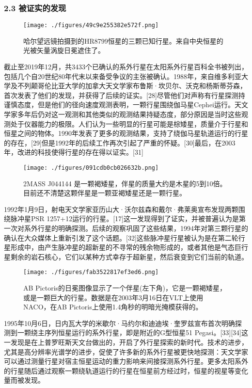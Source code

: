 \subsubsection{2.3 被证实的发现}
\begin{figure}[ht]
\centering
\texttt{[image: ./figures/49c9e255382e572f.png]}
\caption{哈尔望远镜拍摄到的HR8799恒星的三颗已知行星。来自中央恒星的光被矢量涡旋日冕遮住了。} \label{fig_TYXWXX_2}
\end{figure}
截止至2019年12月，共3433个已确认的系外行星在太阳系外行星百科全书被列出，包括几个自20世纪80年代末以来备受争议的主张被确认。1988年，来自维多利亚大学及不列颠哥伦比亚大学的加拿大天文学家布鲁斯·坎贝尔、沃克和杨斯蒂芬森，首次发表了他们的发现，并获得了后续的证实。[28]尽管他们对声称有行星探测持谨慎态度，但是他们的径向速度观测表明，一颗行星围绕伽马星Cephei运行。天文学家多年后仍对这一观测和其他类似的观测结果持疑态度，部分原因是当时这些观测处于仪器能力的极限。人们认为一些明显的行星可能是棕矮星，质量介于行星和恒星之间的物体。1990年发表了更多的观测结果，支持了绕伽马星轨道运行的行星的存在，[29]但是1992年的后续工作再次引起了严重的怀疑。[30]最后，在2003年，改进的科技使得行星的存在得以证实。[31]
\begin{figure}[ht]
\centering
\texttt{[image: ./figures/091cdb0cb026632b.png]}
\caption{2MASS J044144 是一颗褐矮星，伴星的质量大约是木星的5到10倍。目前还不清楚这颗伴星是一颗亚褐矮星还是一颗行星。} \label{fig_TYXWXX_3}
\end{figure}
1992年1月9日，射电天文学家亚历山大·沃尔兹森和戴尔·弗莱奥宣布发现两颗围绕脉冲星PSR 1257+12运行的行星。[17]这一发现得到了证实，并被普遍认为是第一次对系外行星的明确探测。后续的观察巩固了这些结果，1994年对第三颗行星的确认在大众媒体上重新引发了这个话题。[32]这些脉冲星行星被认为是在第二轮行星形成中，由产生脉冲星的超新星的不寻常的残余物形成的，或者其他是气态巨行星剩余的岩石核心，它们以某种方式幸存于超新星，然后衰变到它们当前的轨道。
\begin{figure}[ht]
\centering
\texttt{[image: ./figures/fab3522817ef3ed6.png]}
\caption{AB Pictoris的日冕图像显示了一个伴星(左下角)，它是一颗褐矮星，或是一颗巨大的行星。数据是在2003年3月16日在VLT上使用NACO，在AB Pictoris上使用1.4角秒的明暗光掩模获得的。} \label{fig_TYXWXX_4}
\end{figure}
1995年10月6日，日内瓦大学的米歇尔·马约尔和迪迪埃·奎罗兹宣布首次明确探测到一颗绕主序列恒星运行的系外行星，即是附近的G型恒星51 Pegasi。[33][34]这一发现是在上普罗旺斯天文台做出的，开启了外行星探索的新时代。技术的进步，尤其是高分辨率光谱学的进步，促使了许多新的系外行星被更快地探测：天文学家可以通过测量行星对宿主恒星运动的重力影响来间接探测系外行星。更多太阳系外的行星随后通过观察一颗绕轨道运行的行星在恒星前方经过时，恒星的视星等变化量而被发现。

